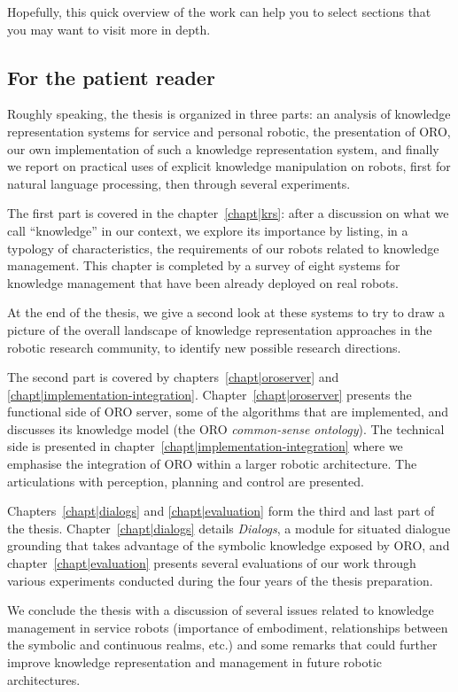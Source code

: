 Hopefully, this quick overview of the work can help you to select sections that
you may want to visit more in depth.

\subsection*{For the patient reader}

Roughly speaking, the thesis is organized in three parts: an analysis of
knowledge representation systems for service and personal robotic, the
presentation of ORO, our own implementation of such a knowledge representation
system, and finally we report on practical uses of explicit knowledge
manipulation on robots, first for natural language processing, then through
several experiments.

The first part is covered in the chapter~\ref{chapt|krs}: after a discussion on
what we call ``knowledge'' in our context, we explore its importance by
listing, in a typology of characteristics, the requirements of our robots
related to knowledge management. This chapter is completed by a survey of
eight systems for knowledge management that have been already deployed on real
robots.

At the end of the thesis, we give a second look at these systems to try to
draw a picture of the overall landscape of knowledge representation approaches
in the robotic research community, to identify new possible research directions.

The second part is covered by chapters~\ref{chapt|oroserver} and
\ref{chapt|implementation-integration}. Chapter~\ref{chapt|oroserver} presents
the functional side of ORO server, some of the algorithms that are
implemented, and discusses its knowledge model (the ORO \emph{common-sense
ontology}). The technical side is presented in
chapter~\ref{chapt|implementation-integration} where we emphasise the
integration of ORO within a larger robotic architecture. The articulations with
perception, planning and control are presented.

Chapters~\ref{chapt|dialogs} and \ref{chapt|evaluation} form the third and last
part of the thesis. Chapter~\ref{chapt|dialogs} details \emph{Dialogs}, a
module for situated dialogue grounding that takes advantage of the symbolic
knowledge exposed by ORO, and chapter~\ref{chapt|evaluation} presents
several evaluations of our work through various experiments conducted during
the four years of the thesis preparation.

We conclude the thesis with a discussion of several issues related to knowledge
management in service robots (importance of embodiment, relationships between
the symbolic and continuous realms, etc.) and some remarks that could further
improve knowledge representation and management in future robotic
architectures.

